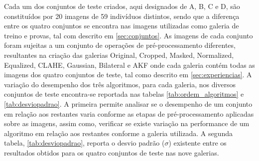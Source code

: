 Cada um dos conjuntos de teste criados, aqui designados de A, B, C e D,  são constituídos por 20 imagens de 59 indivíduos distintos, sendo que a diferença entre os quatro conjuntos se encontra nas imagens utilizadas como galeria de treino e provas, tal com descrito em \ref{sec:conjuntos}. As imagens de cada conjunto foram sujeitas a um conjunto de operações de pré-processamento diferentes, resultantes na criação das galerias Original, Cropped, Masked, Normalized, Equalized, CLAHE, Gaussian, Bilateral e AKF onde cada galeria contém todas as imagens dos quatro conjuntos de teste, tal como descrito em \ref{sec:experiencias}. A variação do desempenho dos três algoritmos, para cada galeria, nos diversos conjuntos de teste encontra-se reportada nas tabelas \ref{tab:ordem_algoritmos} e \ref{tab:desviopadrao}. A primeira permite analisar se o desempenho de um conjunto em relação aos restantes varia conforme as etapas de pré-processamento aplicadas sobre as imagens, assim como, verificar se existe variação na performance de um algoritmo em relação aos restantes conforme a galeria utilizada. A segunda tabela, \ref{tab:desviopadrao}, reporta o desvio padrão ($\sigma$) existente entre os resultados obtidos para os quatro conjuntos de teste nas nove galerias.

